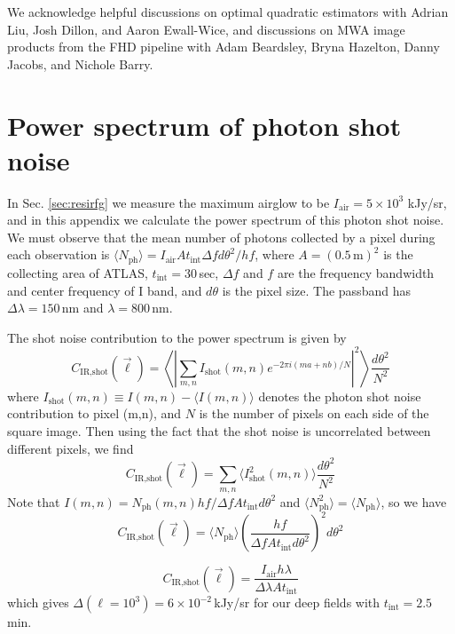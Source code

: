 \documentclass[numberedappendix]{emulateapj}
\newcommand{\IR}{\text{IR}}
\newcommand{\shot}{\text{shot}}
\begin{document}
\begin{acknowledgments}
We acknowledge helpful discussions on optimal quadratic estimators with Adrian Liu, Josh Dillon, and Aaron Ewall-Wice, and discussions on MWA image products from the FHD pipeline with Adam Beardsley, Bryna Hazelton, Danny Jacobs, and Nichole Barry. 
\end{acknowledgments}

\appendix

\section{Power spectrum of photon shot noise}
\label{sec:Pshot}

In Sec. \ref{sec:resirfg} we measure the maximum airglow to be $I_\text{air}=5\times10^3$ kJy/sr, and in this appendix we calculate the power spectrum of this photon shot noise. We must observe that the mean number of photons collected by a pixel during each observation is $\langle N_\text{ph}\rangle=I_\text{air}At_\text{int} \Delta f d\theta^2/hf$, where $A=(0.5\,\text{m})^2$ is the collecting area of ATLAS, $t_\text{int}=30\,$sec, $\Delta f$ and $f$ are the frequency bandwidth and center frequency of I band, and $d\theta$ is the pixel size. The passband has $\Delta\lambda=150\,$nm and $\lambda=800\,$nm. 

The shot noise contribution to the power spectrum is given by
\begin{equation}
C_{\IR, \shot}(\vec{\ell}) = \left\langle\left|\sum_{m,n}I_\shot(m,n)e^{-2\pi i(ma+nb)/N}\right|^2\right\rangle \frac{d\theta^2}{N^2}
\end{equation}
where $I_\shot(m,n)\equiv I(m,n)-\langle I(m,n)\rangle$ denotes the photon shot noise contribution to pixel (m,n), and $N$ is the number of pixels on each side of the square image. Then using the fact that the shot noise is uncorrelated between different pixels, we find
\begin{equation}
C_{\IR, \shot}(\vec{\ell}) = \sum_{m,n}\langle I^2_\shot(m,n)\rangle \frac{d\theta^2}{N^2}
\end{equation}
Note that $I(m,n)=N_\text{ph}(m,n)hf/\Delta f A t_\text{int}d\theta^2$ and $\langle N_\text{ph}^2\rangle = \langle N_\text{ph}\rangle$, so we have
\begin{equation}
C_{\IR, \shot}(\vec{\ell}) = \langle N_\text{ph}\rangle \left(\frac{hf}{\Delta f A t_\text{int}d\theta^2}\right)^2 d\theta^2
\end{equation}

\begin{equation}
C_{\IR, \shot}(\vec{\ell}) =\frac{I_\text{air}h\lambda}{\Delta \lambda A t_\text{int}}
\end{equation}
which gives $\Delta(\ell=10^3)=6\times10^{-2}$\,kJy/sr for our deep fields with $t_\text{int}=2.5$\,min. %
\end{document}
